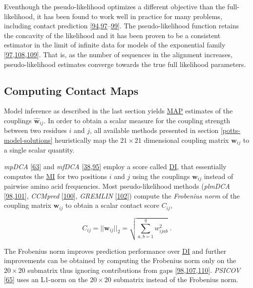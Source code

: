 \documentclass[11pt,a4paper,twoside]{book}
\newcommand{\w}{\mathbf{w}}
\newcommand{\wij}{\mathbf{w}_{ij}}
\newcommand{\wijab}{w_{ijab}}
\theoremstyle{definition}
\theoremstyle{definition}
\theoremstyle{remark}
\begin{document}
Eventhough the pseudo-likelihood optimizes a different objective than
the full-likelihood, it has been found to work well in practice for many
problems, including contact prediction
{[}\protect\hyperlink{ref-Murphy2012}{94},\protect\hyperlink{ref-Koller2009}{97}--\protect\hyperlink{ref-Stein2015a}{99}{]}.
The pseudo-likelihood function retains the concavity of the likelihood
and it has been proven to be a consistent estimator in the limit of
infinite data for models of the exponential family
{[}\protect\hyperlink{ref-Koller2009}{97},\protect\hyperlink{ref-Besag1975}{108},\protect\hyperlink{ref-Gidas1988}{109}{]}.
That is, as the number of sequences in the alignment increases,
pseudo-likelihood estimates converge towards the true full likelihood
parameters.

\subsection{Computing Contact Maps}\label{post-processing-heuristics}

Model inference as described in the last section yields
\protect\hyperlink{abbrev}{MAP} estimates of the couplings
\(\hat{\w}_{ij}\). In order to obtain a scalar measure for the coupling
strength between two residues \(i\) and \(j\), all available methods
presented in section \ref{potts-model-solutions} heuristically map the
\(21 \! \times \! 21\) dimensional coupling matrix \(\wij\) to a single
scalar quantity.

\emph{mpDCA} {[}\protect\hyperlink{ref-Weigt2009}{63}{]} and
\emph{mfDCA}
{[}\protect\hyperlink{ref-Marks2011}{38},\protect\hyperlink{ref-Morcos2011}{95}{]}
employ a score called \protect\hyperlink{abbrev}{DI}, that essentially
computes the \protect\hyperlink{abbrev}{MI} for two positions \(i\) and
\(j\) using the couplings \(\wij\) instead of pairwise amino acid
frequencies. Most pseudo-likelihood methods (\emph{plmDCA}
{[}\protect\hyperlink{ref-Ekeberg2013}{98},\protect\hyperlink{ref-Ekeberg2014}{101}{]},
\emph{CCMpred} {[}\protect\hyperlink{ref-Seemayer2014}{100}{]},
\emph{GREMLIN} {[}\protect\hyperlink{ref-Kamisetty2013}{102}{]}) compute
the \emph{Frobenius norm} of the coupling matrix \(\wij\) to obtain a
scalar contact score \(C_{ij}\),

\begin{equation}
    C_{ij}  = ||\wij||_2 = \sqrt{\sum_{a,b=1}^q \wijab^2} \; .
\label{eq:frobenius-norm}
\end{equation}

The Frobenius norm improves prediction performance over
\protect\hyperlink{abbrev}{DI} and further improvements can be obtained
by computing the Frobenius norm only on the \(20 \times 20\) submatrix
thus ignoring contributions from gaps
{[}\protect\hyperlink{ref-Ekeberg2013}{98},\protect\hyperlink{ref-Baldassi2014}{107},\protect\hyperlink{ref-Feinauer2014}{110}{]}.
\emph{PSICOV} {[}\protect\hyperlink{ref-Jones2012}{65}{]} uses an
L1-norm on the \(20 \times 20\) submatrix instead of the Frobenius norm.
\end{document}
